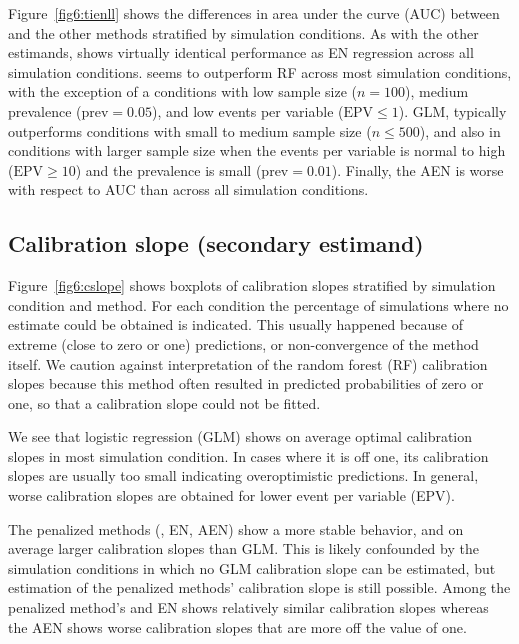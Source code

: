 \begin{subappendices}
Figure~\ref{fig6:tienll} shows the differences in area under the curve (AUC)
between \ainet{} and the other methods stratified by simulation conditions. As
with the other estimands, \ainet{} shows virtually identical performance as EN
regression across all simulation conditions. \ainet{} seems to outperform RF
across most simulation conditions, with the exception of a conditions with low
sample size ($n = 100$), medium prevalence ($\mbox{prev} = 0.05$), and low
events per variable ($\mbox{EPV} \leq 1$). GLM, typically outperforms \ainet{}
conditions with small to medium sample size ($n \leq 500$), and also in
conditions with larger sample size when the events per variable is normal to
high ($\mbox{EPV} \geq 10$) and the prevalence is small ($\mbox{prev} = 0.01$).
Finally, the AEN is worse with respect to AUC than \ainet{} across all
simulation conditions.


\subsection{Calibration slope (secondary estimand)}

Figure~\ref{fig6:cslope} shows boxplots of calibration slopes stratified by
simulation condition and method. For each condition the percentage of
simulations where no estimate could be obtained is indicated. This usually
happened because of extreme (close to zero or one) predictions, or
non-convergence of the method itself. We caution against interpretation of the
random forest (RF) calibration slopes because this method often resulted in
predicted probabilities of zero or one, so that a calibration slope could not be
fitted.

We see that logistic regression (GLM) shows on average optimal calibration
slopes in most simulation condition. In cases where it is off one, its
calibration slopes are usually too small indicating overoptimistic predictions.
In general, worse calibration slopes are obtained for lower event per variable
(EPV).

The penalized methods (\ainet{}, EN, AEN) show a more stable behavior, and on
average larger calibration slopes than GLM. This is likely confounded by the
simulation conditions in which no GLM calibration slope can be estimated, but
estimation of the penalized methods' calibration slope is still possible. Among
the penalized method's \ainet{} and EN shows relatively similar calibration
slopes whereas the AEN shows worse calibration slopes that are more off the
value of one.



\end{subappendices}
